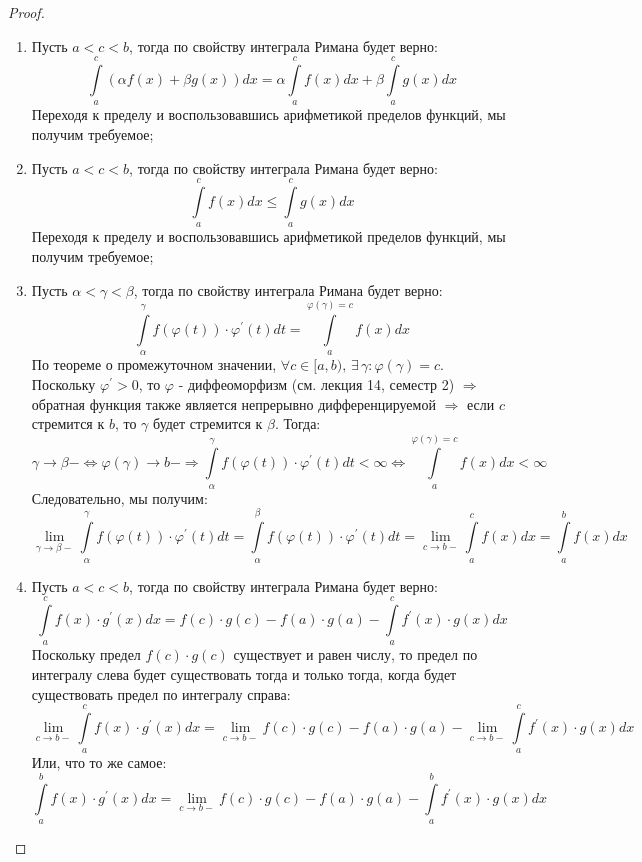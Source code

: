 \documentclass[12pt]{article}
\theoremstyle{definition}
\newcommand{\ddint}[2]{\displaystyle\int\limits_{#1}^{#2}}
\begin{document}
\begin{proof}\hfill
	\begin{enumerate}[label ={(\arabic*)}]
		\item Пусть $a < c < b$, тогда по свойству интеграла Римана будет верно:
		$$
			\ddint{a}{c}\left(\alpha f(x) + \beta g(x)\right)dx = \alpha \ddint{a}{c}f(x)dx + \beta\ddint{a}{c}g(x) dx
		$$
		Переходя к пределу и воспользовавшись арифметикой пределов функций, мы получим требуемое;
		
		\item Пусть $a < c < b$, тогда по свойству интеграла Римана будет верно:
		$$
			\ddint{a}{c}f(x)dx \leq \ddint{a}{c}g(x)dx
		$$
		Переходя к пределу и воспользовавшись арифметикой пределов функций, мы получим требуемое;
		
		\item Пусть $\alpha < \gamma < \beta$, тогда по свойству интеграла Римана будет верно:
		$$
			\ddint{\alpha}{\gamma}f\left(\varphi(t)\right){\cdot}\varphi^\prime(t)dt = \ddint{a}{\varphi(\gamma) = c}f(x)dx
		$$
		По теореме о промежуточном значении, $\forall c \in [a,b), \, \exists \, \gamma \colon \varphi(\gamma) = c$. Поскольку $\varphi^\prime > 0$, то $\varphi$ - диффеоморфизм (см. лекция 14, семестр 2) $\Rightarrow$ обратная функция также является непрерывно дифференцируемой $\Rightarrow$ если $c$ стремится к $b$, то $\gamma$ будет стремится к $\beta$. Тогда:
		$$
			\gamma \to \beta- \Leftrightarrow \varphi(\gamma) \to b- \Rightarrow \ddint{\alpha}{\gamma}f\left(\varphi(t)\right){\cdot}\varphi^\prime(t)dt < \infty \Leftrightarrow \ddint{a}{\varphi(\gamma) = c}f(x)dx < \infty
		$$
		Следовательно, мы получим:
		$$
			\lim\limits_{\gamma \to \beta- }\ddint{\alpha}{\gamma}f\left(\varphi(t)\right){\cdot}\varphi^\prime(t)dt = \ddint{\alpha}{\beta}f\left(\varphi(t)\right){\cdot}\varphi^\prime(t)dt = 
			\lim\limits_{c \to b-}\ddint{a}{c} f(x)dx =
			\ddint{a}{b} f(x)dx
		$$
		
		\item Пусть $a < c < b$, тогда по свойству интеграла Римана будет верно:
		$$
			\ddint{a}{c}f(x){\cdot}g^\prime(x)dx = f(c){\cdot}g(c) - f(a){\cdot}g(a) - \ddint{a}{c}f^\prime(x){\cdot}g(x)dx
		$$
		Поскольку предел  $f(c){\cdot}g(c)$ существует и равен числу, то предел по интегралу слева будет существовать тогда и только тогда, когда будет существовать предел по интегралу справа:
		$$
			\lim\limits_{c \to b-}\ddint{a}{c}f(x){\cdot}g^\prime(x)dx = \lim\limits_{c \to b-}f(c){\cdot}g(c) - f(a){\cdot}g(a) - \lim\limits_{c \to b-}\ddint{a}{c}f^\prime(x){\cdot}g(x)dx
		$$
		Или, что то же самое:
		$$
			\ddint{a}{b}f(x){\cdot}g^\prime(x)dx = \lim\limits_{c \to b-}f(c){\cdot}g(c) - f(a){\cdot}g(a) - \ddint{a}{b}f^\prime(x){\cdot}g(x)dx
		$$
	\end{enumerate}
\end{proof}
\end{document}
